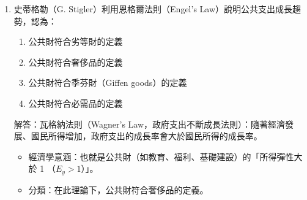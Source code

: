 \documentclass[12pt, a4paper]{article}
\begin{document}
\begin{enumerate}
    \item 史蒂格勒（G. Stigler）利用恩格爾法則（Engel's Law）說明公共支出成長趨勢，認為：
    \begin{enumerate}[label=\Alph*.]
        \item 公共財符合劣等財的定義
        \item 公共財符合奢侈品的定義
        \item 公共財符合季芬財（Giffen goods）的定義
        \item 公共財符合必需品的定義
    \end{enumerate}
    解答：瓦格納法則（Wagner's Law，政府支出不斷成長法則）：隨著經濟發展、國民所得增加，政府支出的成長率會大於國民所得的成長率。
    \begin{itemize}
        \item 經濟學意涵：也就是公共財（如教育、福利、基礎建設）的「所得彈性大於 1 （\(E_y > 1\)）」。
        \item 分類：在此理論下，公共財符合奢侈品的定義。
    \end{itemize}


\end{enumerate}
\end{document}
